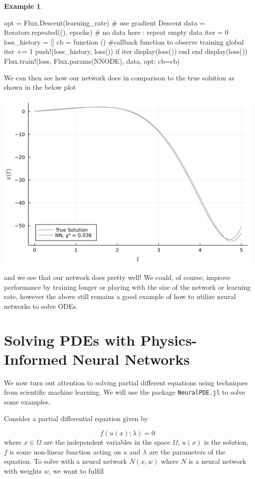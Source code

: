 \documentclass{CUP-JNL-DTM}%
\theoremstyle{definition}
\newtheorem{example}[theorem]{Example}
\numberwithin{equation}{section}
\begin{document}
\begin{example}
\begin{jllisting}
opt = Flux.Descent(learning_rate) # use gradient Descent
data = Iterators.repeated((), epochs) # no data here : repeat empty data
iter = 0
loss_history = []
cb = function () #callback function to observe training
  global iter += 1
  push!(loss_history, loss())
  if iter %
    display(loss())
  end
end
display(loss())
Flux.train!(loss, Flux.params(NNODE), data, opt; cb=cb)
\end{jllisting}
We can then see how our network does in comparison to the true solution as shown in the below plot

\begin{center}
\includegraphics[width=0.45\linewidth]{figures/ODE_example.png}
\end{center}
and we see that our network does pretty well! We could, of course, improve performance by training longer or playing with the size of the network or learning rate, however the above still remains a good example of how to utilize neural networks to solve ODEs. 
	
\end{example}


\section{Solving PDEs with Physics-Informed Neural Networks}

We now turn out attention to solving partial different equations using techniques from scientific machine learning. We will use the package \texttt{NeuralPDE.jl} \cite{zubovNeuralPDEAutomatingPhysicsInformed2021} to solve some examples. 

Consider a partial differential equation given by 

\begin{equation}
	f(u(x); \lambda) = 0
\end{equation}
where $x \in \Omega$ are the independent variables in the space $\Omega$, $u(x)$ is the solution, $f$ is some non-linear function acting on $u$ and $\lambda$ are the parameters of the equation. To solve with a neural network $N(x, w)$ where $N$ is a neural network with weights $w$, we want to fulfill 
\end{document}

